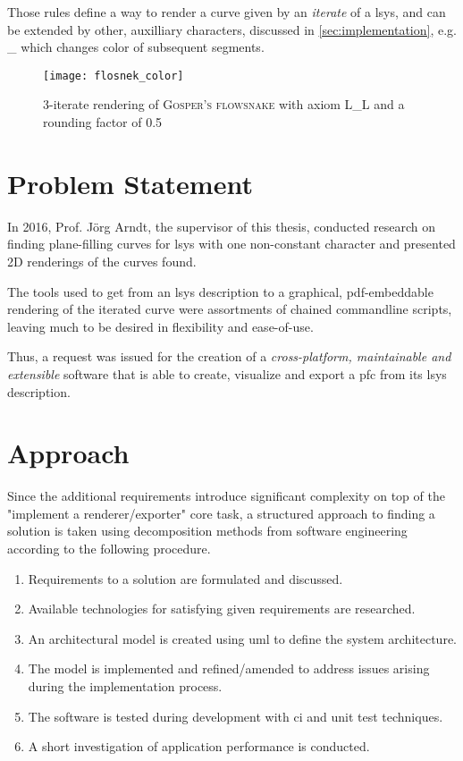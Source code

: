 Those rules define a way to render a curve given by an \textit{iterate} of a \gls{lsys}, and can be extended by other, auxilliary characters, discussed in \ref{sec:implementation}, e.g. \_ which changes color of subsequent segments.

\begin{figure}[hb]
	\centering
	\texttt{[image: flosnek\_color]}
	\caption{3-iterate rendering of \textsc{Gosper's flowsnake} with axiom \textrm{L\_L} and a rounding factor of 0.5}
\end{figure}

\section{Problem Statement}
In 2016, Prof. Jörg Arndt, the supervisor of this thesis, conducted research on finding plane-filling curves for \gls{lsys} with one non-constant character \citep{Arndt2016} and presented 2D renderings of the curves found.

The tools used to get from an \gls{lsys} description to a graphical, pdf-embeddable rendering of the iterated curve were assortments of chained commandline scripts, leaving much to be desired in flexibility and ease-of-use.

Thus, a request was issued for the creation of a \emph{cross-platform, maintainable and extensible} software that is able to create, visualize and export a \gls{pfc} from its \gls{lsys} description.

\section{Approach}
Since the additional requirements introduce significant complexity on top of the "implement a renderer/exporter" core task, a structured approach to finding a solution is taken using decomposition methods from software engineering according to the following procedure.
\begin{enumerate}
\item Requirements to a solution are formulated and discussed.
\item Available technologies for satisfying given requirements are researched.
\item An architectural model is created using \gls{uml} to define the system architecture.
\item The model is implemented and refined/amended to address issues arising during the implementation process.
\item The software is tested during development with \gls{ci} and \gls{unit test} techniques.
\item A short investigation of application performance is conducted.
\end{enumerate}

